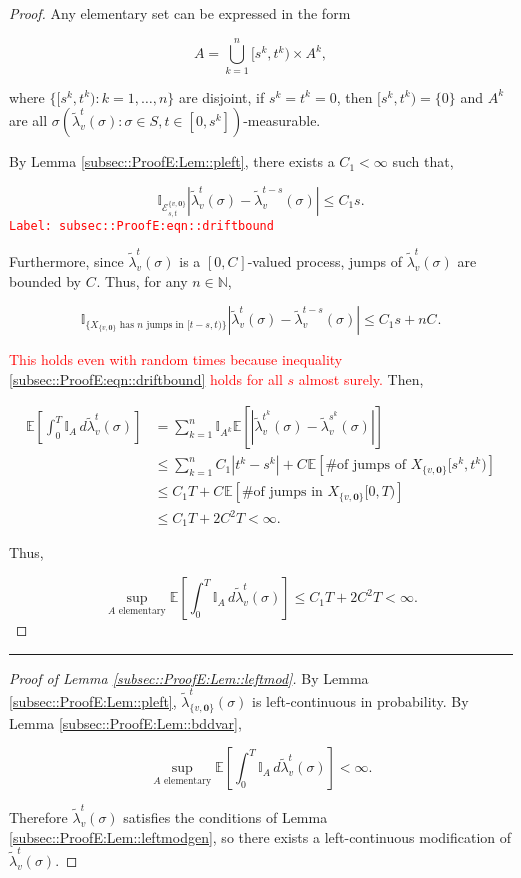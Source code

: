 \documentclass[12pt]{article}
\newcommand{\mb}{\mathbb}
\newcommand{\mc}{\mathcal}
\newcommand{\te}{\text}
\newcommand{\tr}{\textcolor{red}}
\newcommand{\labe}[1]{\tr{\texttt{Label: #1}}}
\newcommand{\lin}{\rule{\linewidth}{0.4 pt}}
\newcommand{\ex}[1]{\mb{E}\left[#1\right]}			%
\renewcommand{\root}{\mathbf{0}}				%
\renewcommand{\v}{v}							%
\renewcommand{\S}{S}							%
\newcommand{\s}{\sigma}							%
\newcommand{\T}{T}								%
\renewcommand{\t}{t}							%
\renewcommand{\tt}{s}							%
\newcommand{\pup}[1]{^{#1}}							%
\renewcommand{\it}{k}								%
\newcommand{\numb}{n}								%
\newcommand{\rxvts}[2]{X_{#1}{#2}}					%
\newcommand{\crate}[2]{\alt{\lambda}_{#1}^{#2}}		%
\newcommand{\const}[1]{C_{#1}}						%
\newcommand{\alt}{\widetilde}						%
\newcommand{\evnt}{\mc{E}}						%
\newcommand{\typset}{A}							%
\begin{document}
\begin{proof}
Any elementary set can be expressed in the form

\[\typset = \bigcup_{\it = 1}^\numb [\tt^\it,\t^\it)\times \typset\pup{\it},\]

where \(\{[\tt^\it,\t^\it):\it=1,\dots,\numb\}\) are disjoint, if \(\tt^\it = \t^\it = 0\), then \([\tt^\it,\t^\it) = \{0\}\) and \(\typset\pup{\it}\) are all \(\sigma(\crate{\v}{\t}(\s):\s \in \S,\t\in [0,\tt^\it])\)-measurable. 

By Lemma \ref{subsec::ProofE:Lem::pleft}, there exists a \(\const{1} < \infty\) such that,

\begin{equation}
\mb{I}_{\evnt^{\{\v,\root\}}_{\tt,\t}}|\crate{\v}{\t}(\s) - \crate{\v}{\t-\tt}(\s)| \leq \const{1}\tt.
\label{subsec::ProofE:eqn::driftbound}
\end{equation}
\labe{subsec::ProofE:eqn::driftbound}

Furthermore, since \(\crate{\v}{\t}(\s)\) is a \([0,\const{}]\)-valued process, jumps of \(\crate{\v}{\t}(\s)\) are bounded by \(\const{}\). Thus, for any \(\numb \in \mb{N}\),

\[\mb{I}_{\{\rxvts{\{\v,\root\}}{}\te{ has }\numb\te{ jumps in } [\t-\tt,\t)\}}|\crate{\v}{\t}(\s) - \crate{\v}{\t-\tt}(\s)|\leq C_1\tt + \numb \const{}.\]

\tr{This holds even with random times because inequality \eqref{subsec::ProofE:eqn::driftbound} holds for all \(\tt\) almost surely.} Then,

\begin{align*}
\ex{\int_0^\T \mb{I}_\typset\,d\crate{\v}{\t}(\s)} &= \sum_{\it = 1}^\numb \mb{I}_{\typset^\it}\ex{\left|\crate{\v}{\t^k}(\s) - \crate{\v}{\tt^k}(\s)\right|}\\
&\leq \sum_{\it=1}^\numb \const{1}|\t^\it - \tt^\it| + \const{}\ex{\te{\# of jumps of }\rxvts{\{\v,\root\}}{[\tt^\it,\t^\it)}}\\
&\leq \const{1}\T + \const{}\ex{\te{\# of jumps in }\rxvts{\{\v,\root\}}{[0,\T)}}\\
&\leq \const{1}\T + 2\const{}^2\T < \infty.
\end{align*}

Thus,

\[\sup_{\typset\te{ elementary}} \ex{\int_0^\T \mb{I}_\typset\,d\crate{\v}{\t}(\s)} \leq \const{1}\T + 2\const{}^2\T < \infty.\]
\end{proof}

\lin

\begin{proof}[Proof of Lemma \ref{subsec::ProofE:Lem::leftmod}]

By Lemma \ref{subsec::ProofE:Lem::pleft}, \(\crate{\{\v,\root\}}{\t}(\s)\) is left-continuous in probability. By Lemma \ref{subsec::ProofE:Lem::bddvar},

\[\sup_{\typset\te{ elementary}} \ex{\int_0^\T \mb{I}_{\typset}\,d\crate{\v}{\t}(\s)} < \infty.\]

Therefore \(\crate{\v}{\t}(\s)\) satisfies the conditions of Lemma \ref{subsec::ProofE:Lem::leftmodgen}, so there exists a left-continuous modification of \(\crate{\v}{\t}(\s)\).
\end{proof}
\end{document}
